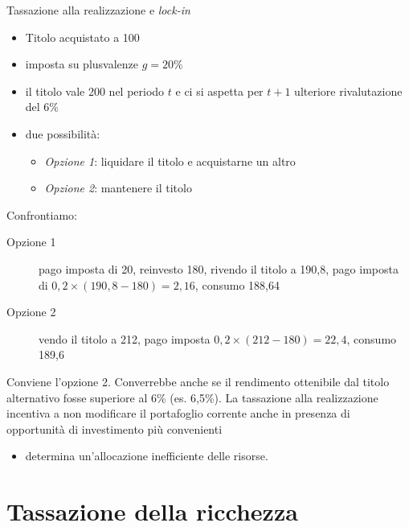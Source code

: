 \documentclass[11pt,italian]{beamer}
\begin{document}
\begin{frame}{Tassazione alla realizzazione e \emph{lock-in}}
\begin{itemize}
\item Titolo acquistato a 100
\item imposta su plusvalenze $g=20\%$
\item il titolo vale 200 nel periodo $t$ e ci si aspetta per $t+1$ ulteriore
rivalutazione del 6\%
\item due possibilità:
\begin{itemize}
\item \emph{Opzione 1}: liquidare il titolo e acquistarne un altro
\item \emph{Opzione 2}: mantenere il titolo
\end{itemize}
\end{itemize}
Confrontiamo:
\begin{description}
\item[{Opzione 1}] pago imposta di 20, reinvesto 180, rivendo il titolo a 190,8, pago
imposta di $0,2\times(190,8-180)=2,16$, consumo 188,64
\item[{Opzione 2}] vendo il titolo a 212, pago imposta $0,2\times(212-180)=22,4$,
consumo 189,6
\end{description}
Conviene l'opzione 2. Converrebbe anche se il rendimento ottenibile dal titolo
alternativo fosse superiore al 6\% (es. 6,5\%).  La tassazione alla
realizzazione incentiva a non modificare il portafoglio corrente \alert{anche in
presenza di opportunità di investimento più convenienti}
\begin{itemize}
\item determina \alert{un'allocazione inefficiente delle risorse}.
\end{itemize}
\end{frame}

\section{Tassazione della ricchezza}
\end{document}
